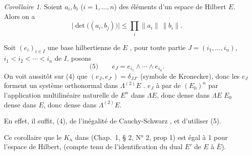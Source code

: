 \documentclass[11pt,a4paper]{article}
\begin{document}
\emph{Corollaire 1.} Soient $a_i, b_i$ ($i = 1, \ldots, n$) des éléments d'un espace de Hilbert $E$. Alors on a
\[
  \bigl|\det\bigl((a_i, b_j)\bigr)\bigr| \leq \prod_i \|a_i\|\, \|b_i\| .
\]
\marginal{\ill{}} 

Soit $(e_i)_{i \in I}$ une base hilbertienne de $E$ , pour toute partie  $J = (i_1, \ldots, i_n)$, $i_1 < i_2 < \cdots < i_n$ de $I$, posons
\[
  \text{(5)}\qquad e_J = e_{i_1} \wedge \cdots \wedge e_{i_n} .
\]
On voit aussitôt sur (4) que $(e_J, e_{J'}) = \delta_{JJ'}$ (symbole de Kronecker), donc les $e_J$ forment un système orthonormal dans $\Lambda^{(2)} E$ .     $e_J$    à   par  de $(E_0)^{n}$ par l'application multilinéaire naturelle de $E^{n}$ dans $\Lambda E$, donc   dense dans $\Lambda E$  $E_0$  dense dans $E$, donc dense dans $\Lambda^{(2)} E$. 

En effet, il suffit,  (4), de \ill{} l'inégalité de Cauchy-Schwarz    , et d'utiliser (5).

Ce corollaire  que le  $K_n$   dans (Chap.~1, § 2, N° 2, prop 1) est égal à 1 pour l'espace de Hilbert, (compte tenu de l'identification du dual $E'$ de $E$ à $\bar{E}$).
\end{document}
